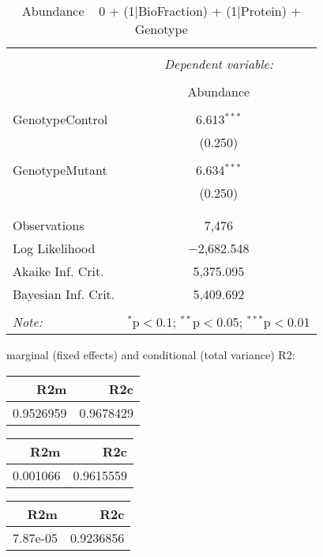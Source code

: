 \documentclass[11pt]{report}
\begin{document}
\begin{table}[!htbp] \centering 
  \caption{Abundance ~ 0 + (1|BioFraction) + (1|Protein) + Genotype} 
  \label{} 
\begin{tabular}{@{\extracolsep{5pt}}lc} 
\\[-1.8ex]\hline 
\hline \\[-1.8ex] 
 & \multicolumn{1}{c}{\textit{Dependent variable:}} \\ 
\cline{2-2} 
\\[-1.8ex] & Abundance \\ 
\hline \\[-1.8ex] 
 GenotypeControl & 6.613$^{***}$ \\ 
  & (0.250) \\ 
  & \\ 
 GenotypeMutant & 6.634$^{***}$ \\ 
  & (0.250) \\ 
  & \\ 
\hline \\[-1.8ex] 
Observations & 7,476 \\ 
Log Likelihood & $-$2,682.548 \\ 
Akaike Inf. Crit. & 5,375.095 \\ 
Bayesian Inf. Crit. & 5,409.692 \\ 
\hline 
\hline \\[-1.8ex] 
\textit{Note:}  & \multicolumn{1}{r}{$^{*}$p$<$0.1; $^{**}$p$<$0.05; $^{***}$p$<$0.01} \\ 
\end{tabular} 
\end{table} 
marginal (fixed effects) and conditional (total variance) R2:

\begin{tabular}{r|r}
\hline
R2m & R2c\\
\hline
0.9526959 & 0.9678429\\
\hline
\end{tabular}

\begin{tabular}{r|r}
\hline
R2m & R2c\\
\hline
0.001066 & 0.9615559\\
\hline
\end{tabular}

\begin{tabular}{r|r}
\hline
R2m & R2c\\
\hline
7.87e-05 & 0.9236856\\
\hline
\end{tabular}
\end{document}
